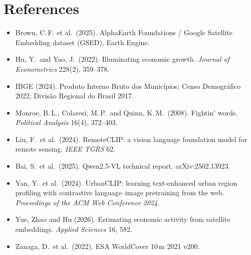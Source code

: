 \documentclass[11pt,a4paper]{article}
\begin{document}
\section*{References}
{\small
\begin{itemize}[leftmargin=*,label={}]
\item Brown, C.\,F. et al.\ (2025). AlphaEarth Foundations / Google Satellite Embedding dataset (GSED), Earth Engine.
\item Hu, Y.\ and Yao, J.\ (2022). Illuminating economic growth. \emph{Journal of Econometrics} 228(2), 359--378.
\item IBGE (2024). Produto Interno Bruto dos Municípios; Censo Demográfico 2022; Divisão Regional do Brasil 2017.
\item Monroe, B.\,L., Colaresi, M.\,P.\ and Quinn, K.\,M.\ (2008). Fightin' words. \emph{Political Analysis} 16(4), 372--403.
\item Liu, F.\ et al.\ (2024). RemoteCLIP: a vision language foundation model for remote sensing. \emph{IEEE TGRS} 62.
\item Bai, S.\ et al.\ (2025). Qwen2.5-VL technical report. arXiv:2502.13923.
\item Yan, Y.\ et al.\ (2024). UrbanCLIP: learning text-enhanced urban region profiling with contrastive language--image
pretraining from the web. \emph{Proceedings of the ACM Web Conference 2024}.
\item Yue, Zhao and Hu (2026). Estimating economic activity from satellite embeddings. \emph{Applied Sciences} 16, 582.
\item Zanaga, D.\ et al.\ (2022). ESA WorldCover 10\,m 2021 v200.
\end{itemize}}
\end{document}
